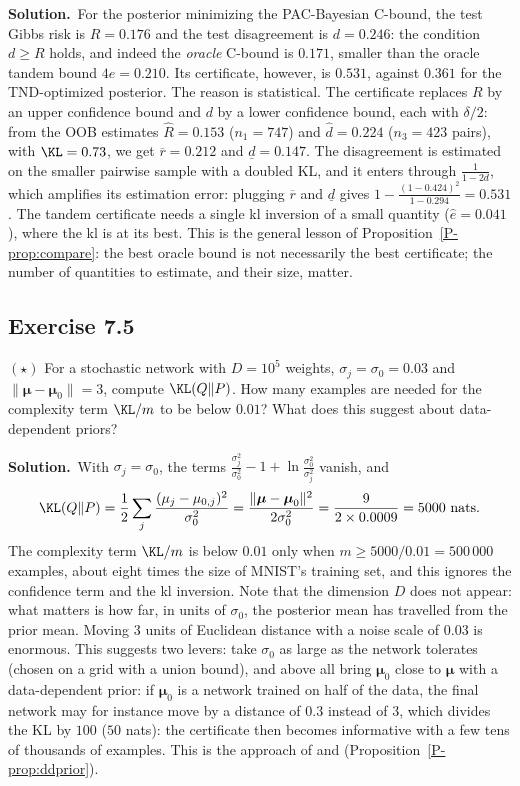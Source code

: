 \documentclass[11pt]{article}
\newcommand{\statement}[1]{\begin{tcolorbox}[enhanced,breakable,colback=black!3,colframe=black!25,boxrule=0.4pt,sharp corners,fontupper=\itshape\small]#1\end{tcolorbox}}
\newcommand{\exo}[1]{\Needspace{6\baselineskip}\subsection*{Exercise #1}\addcontentsline{toc}{subsection}{Exercise #1}}
\newcommand{\sol}{\noindent\textbf{Solution.}\ }
\begin{document}
\sol For the posterior minimizing the PAC-Bayesian C-bound, the test Gibbs risk is $R=0.176$ and the test
disagreement is $d=0.246$: the condition $d\geq R$ holds, and indeed the \emph{oracle} C-bound is $0.171$, smaller than the
oracle tandem bound $4e=0.210$. Its certificate, however, is $0.531$, against $0.361$ for the TND-optimized posterior. The
reason is statistical. The certificate replaces $R$ by an upper confidence bound and $d$ by a lower confidence bound,
each with $\delta/2$: from the OOB estimates $\hat R=0.153$ ($n_1=747$) and $\hat d=0.224$ ($n_3=423$ pairs), with $\KL=0.73$,
we get $\overline r=0.212$ and $\underline d=0.147$. The disagreement is estimated on the smaller pairwise sample with a doubled KL,
and it enters through $\frac1{1-2d}$, which amplifies its estimation error: plugging $\overline r$ and $\underline d$ gives
$1-\frac{(1-0.424)^2}{1-0.294}=0.531$. The tandem certificate needs a single kl inversion of a small quantity ($\hat e=0.041$),
where the kl is at its best. This is the general lesson of Proposition~\ref{P-prop:compare}: the best oracle bound is not
necessarily the best certificate; the number of quantities to estimate, and their size, matter.

\exo{7.5}
\statement{$(\star)$ For a stochastic network with $D=10^5$ weights, $\sigma_j=\sigma_0=0.03$ and $\|\boldsymbol\mu-\boldsymbol\mu_0\|=3$, compute
$\KL(Q\|P)$. How many examples are needed for the complexity term $\KL/m$ to be below $0.01$? What does this suggest
about data-dependent priors?}

\sol With $\sigma_j=\sigma_0$, the terms $\frac{\sigma_j^2}{\sigma_0^2}-1+\ln\frac{\sigma_0^2}{\sigma_j^2}$ vanish, and
\[
\KL(Q\|P)=\frac12\sum_j\frac{(\mu_j-\mu_{0,j})^2}{\sigma_0^2}=\frac{\|\boldsymbol\mu-\boldsymbol\mu_0\|^2}{2\sigma_0^2}=\frac{9}{2\times0.0009}=5000\text{ nats}.
\]
The complexity term $\KL/m$ is below $0.01$ only when $m\geq5000/0.01=500\,000$ examples, about eight times the size of
MNIST's training set, and this ignores the confidence term and the kl inversion. Note that the dimension $D$ does not
appear: what matters is how far, in units of $\sigma_0$, the posterior mean has travelled from the prior mean. Moving
$3$ units of Euclidean distance with a noise scale of $0.03$ is enormous. This suggests two levers: take $\sigma_0$ as large
as the network tolerates (chosen on a grid with a union bound), and above all bring $\boldsymbol\mu_0$ close to $\boldsymbol\mu$ with a
data-dependent prior: if $\boldsymbol\mu_0$ is a network trained on half of the data, the final network may for instance move by a
distance of $0.3$ instead of $3$, which divides the KL by $100$ ($50$ nats): the certificate then becomes informative
with a few tens of thousands of examples. This is the approach of \citet{dziugaite2018data} and \citet{perez2021tighter}
(Proposition~\ref{P-prop:ddprior}).
\end{document}
